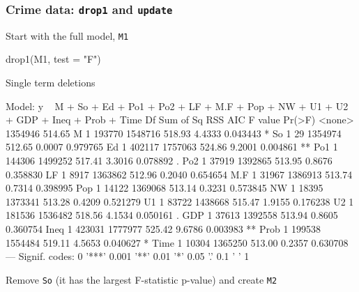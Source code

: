 \documentclass[a4paper]{article}
\begin{document}
\subsubsection{Crime data: \lstinline|drop1| and \lstinline|update|}
Start with the full model, \lstinline|M1|
\begin{Schunk}
\begin{Sinput}
drop1(M1, test = "F")
\end{Sinput}
\begin{Soutput}
Single term deletions

Model:
y ~ M + So + Ed + Po1 + Po2 + LF + M.F + Pop + NW + U1 + U2 + 
    GDP + Ineq + Prob + Time
       Df Sum of Sq     RSS    AIC F value   Pr(>F)   
<none>              1354946 514.65                    
M       1    193770 1548716 518.93  4.4333 0.043443 * 
So      1        29 1354974 512.65  0.0007 0.979765   
Ed      1    402117 1757063 524.86  9.2001 0.004861 **
Po1     1    144306 1499252 517.41  3.3016 0.078892 . 
Po2     1     37919 1392865 513.95  0.8676 0.358830   
LF      1      8917 1363862 512.96  0.2040 0.654654   
M.F     1     31967 1386913 513.74  0.7314 0.398995   
Pop     1     14122 1369068 513.14  0.3231 0.573845   
NW      1     18395 1373341 513.28  0.4209 0.521279   
U1      1     83722 1438668 515.47  1.9155 0.176238   
U2      1    181536 1536482 518.56  4.1534 0.050161 . 
GDP     1     37613 1392558 513.94  0.8605 0.360754   
Ineq    1    423031 1777977 525.42  9.6786 0.003983 **
Prob    1    199538 1554484 519.11  4.5653 0.040627 * 
Time    1     10304 1365250 513.00  0.2357 0.630708   
---
Signif. codes:  0 '***' 0.001 '**' 0.01 '*' 0.05 '.' 0.1 ' ' 1
\end{Soutput}
\end{Schunk}
Remove \lstinline|So| (it has the largest F-statistic p-value) and create \lstinline|M2|
\end{document}
